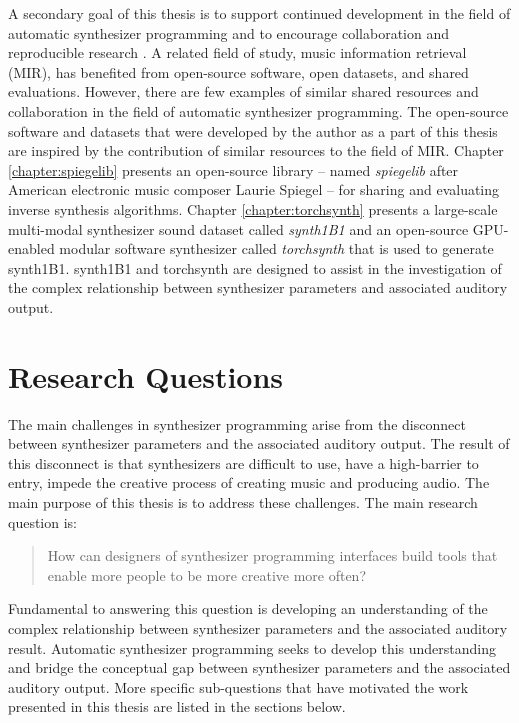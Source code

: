 A secondary goal of this thesis is to support continued development in the field of automatic synthesizer programming and to encourage collaboration and reproducible research \cite{vandewalle2009reproducible}. A related field of study, music information retrieval (MIR), has benefited from open-source software, open datasets, and shared evaluations.
However, there are few examples of similar shared resources and collaboration in the field of automatic synthesizer programming. The open-source software and datasets that were developed by the author as a part of this thesis are inspired by the contribution of similar resources to the field of MIR.  Chapter \ref{chapter:spiegelib} presents an open-source library -- named \textit{spiegelib} after American electronic music composer Laurie Spiegel -- for sharing and evaluating inverse synthesis algorithms. Chapter \ref{chapter:torchsynth} presents a large-scale multi-modal synthesizer sound dataset called \textit{synth1B1} and an open-source GPU-enabled modular software synthesizer called \textit{torchsynth} that is used to generate synth1B1. synth1B1 and torchsynth are designed to assist in the investigation of the complex relationship between synthesizer parameters and associated auditory output.


\section{Research Questions}
The main challenges in synthesizer programming arise from the disconnect between synthesizer parameters and the associated auditory output. The result of this disconnect is that synthesizers are difficult to use, have a high-barrier to entry, impede the creative process of creating music and producing audio. The main purpose of this thesis is to address these challenges. The main research question is:

\begin{quote}
	How can designers of synthesizer programming interfaces build tools that enable more people to be more creative more often? 
\end{quote}

Fundamental to answering this question is developing an understanding of the complex relationship between synthesizer parameters and the associated auditory result. Automatic synthesizer programming seeks to develop this understanding and bridge the conceptual gap between synthesizer parameters and the associated auditory output. More specific sub-questions that have motivated the work presented in this thesis are listed in the sections below.

